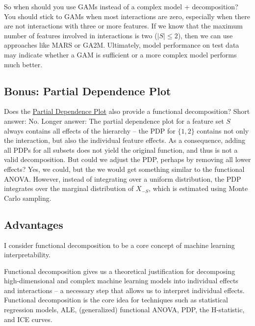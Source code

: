 \documentclass[
  12pt,
]{krantz}
\begin{document}
So when should you use GAMs instead of a complex model + decomposition?
You should stick to GAMs when most interactions are zero, especially when there are not interactions with three or more features.
If we know that the maximum number of features involved in interactions is two (\(|S|\leq{}2\)), then we can use approaches like MARS or GA2M.
Ultimately, model performance on test data may indicate whether a GAM is sufficient or a more complex model performs much better.

\hypertarget{bonus-partial-dependence-plot}{%
\subsection{Bonus: Partial Dependence Plot}\label{bonus-partial-dependence-plot}}

Does the \protect\hyperlink{pdp}{Partial Dependence Plot} also provide a functional decomposition?
Short answer: No.
Longer answer:
The partial dependence plot for a feature set \(S\) always contains all effects of the hierarchy -- the PDP for \(\{1,2\}\) contains not only the interaction, but also the individual feature effects.
As a consequence, adding all PDPs for all subsets does not yield the original function, and thus is not a valid decomposition.
But could we adjust the PDP, perhaps by removing all lower effects?
Yes, we could, but the we would get something similar to the functional ANOVA.
However, instead of integrating over a uniform distribution, the PDP integrates over the marginal distribution of \(X_{-S}\), which is estimated using Monte Carlo sampling.

\hypertarget{advantages-8}{%
\subsection{Advantages}\label{advantages-8}}

I consider functional decomposition to be a core concept of machine learning interpretability.

Functional decomposition gives us a theoretical justification for decomposing high-dimensional and complex machine learning models into individual effects and interactions -- a necessary step that allows us to interpret individual effects.
Functional decomposition is the core idea for techniques such as statistical regression models, ALE, (generalized) functional ANOVA, PDP, the H-statistic, and ICE curves.
\end{document}
